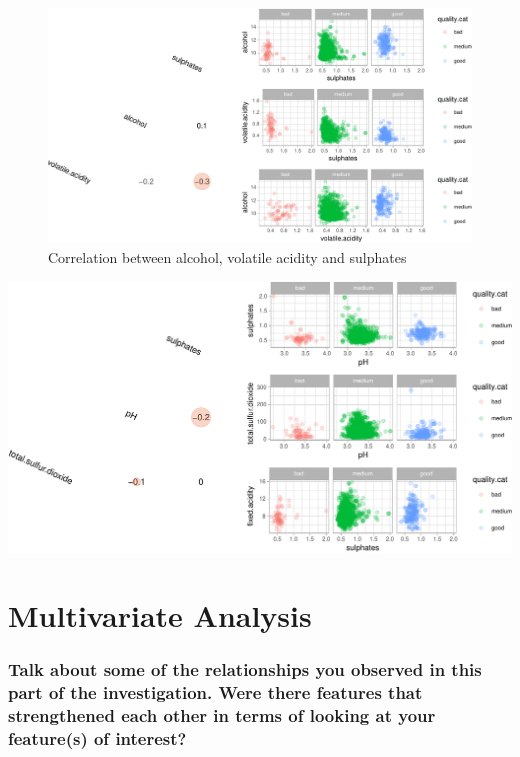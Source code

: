 \documentclass[]{article}
\begin{document}
\begin{figure}

{\centering \includegraphics{Figs/Correlations_comparative_from_table-1} 

}

\caption{Correlation between alcohol, volatile acidity and sulphates \label{Correlations_comparative_from_table}}\label{fig:Correlations_comparative_from_table}
\end{figure}

\begin{center}\includegraphics{Figs/Correlations_comparative_from_article-1} \end{center}

\section{Multivariate Analysis}\label{multivariate-analysis}

\subsubsection{Talk about some of the relationships you observed in this
part of the investigation. Were there features that strengthened each
other in terms of looking at your feature(s) of
interest?}\label{talk-about-some-of-the-relationships-you-observed-in-this-part-of-the-investigation.-were-there-features-that-strengthened-each-other-in-terms-of-looking-at-your-features-of-interest}
\end{document}
